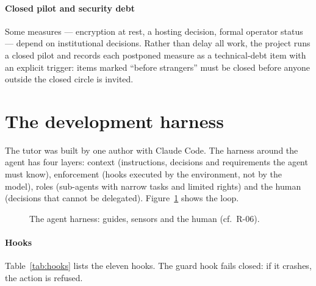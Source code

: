 \paragraph{Closed pilot and security debt} Some measures --- encryption at rest, a hosting decision, formal
operator status --- depend on institutional decisions. Rather than delay all work, the project runs a closed
pilot and records each postponed measure as a technical-debt item with an explicit trigger: items marked
``before strangers'' must be closed before anyone outside the closed circle is invited.

\section{The development harness}\label{sec:impl-harness}

The tutor was built by one author with Claude Code. The harness around the agent has four layers: context
(instructions, decisions and requirements the agent must know), enforcement (hooks executed by the
environment, not by the model), roles (sub-agents with narrow tasks and limited rights) and the human
(decisions that cannot be delegated). Figure~\ref{fig:harness} shows the loop.

\begin{figure}[ht]
\centering
\resizebox{\linewidth}{!}{}
\caption{The agent harness: guides, sensors and the human (cf.\ R-06).}\label{fig:harness}
\end{figure}

\paragraph{Hooks} Table~\ref{tab:hooks} lists the eleven hooks. The guard hook fails closed: if it crashes,
the action is refused.


